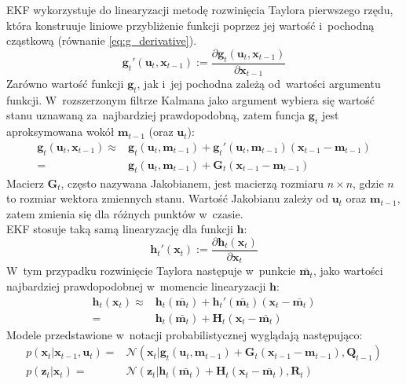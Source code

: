 \par
EKF wykorzystuje do linearyzacji metodę rozwinięcia Taylora pierwszego rzędu, która konstruuje liniowe przybliżenie funkcji poprzez jej wartość i~pochodną cząstkową (równanie \ref{eq:g_derivative}).
\begin{equation} \label{eq:g_derivative}
	\boldsymbol{g}_t'(\boldsymbol{u}_t, \boldsymbol{x}_{t-1}) := \frac{\partial \boldsymbol{g}_t(\boldsymbol{u}_t, \boldsymbol{x}_{t-1})}{\partial \boldsymbol{x}_{t-1}}
\end{equation}
Zarówno wartość funkcji $\boldsymbol{g}_t$, jak i~jej pochodna zależą od~wartości argumentu funkcji. W~rozszerzonym filtrze Kalmana jako argument wybiera się wartość stanu uznawaną za~najbardziej prawdopodobną, zatem funcja $\boldsymbol{g}_t$ jest aproksymowana wokół $\boldsymbol{m}_{t-1}$ (oraz $\boldsymbol{u}_t$):
\begin{align} 
\boldsymbol{g}_t(\boldsymbol{u}_t, \boldsymbol{x}_{t-1}) \approx& \boldsymbol{g}_t(\boldsymbol{u}_t, \boldsymbol{m}_{t-1}) + \boldsymbol{g}_t'(\boldsymbol{u}_t, \boldsymbol{m}_{t-1})(\boldsymbol{x}_{t-1} - \boldsymbol{m}_{t-1}) \nonumber \\
=& \boldsymbol{g}_t(\boldsymbol{u}_t, \boldsymbol{m}_{t-1}) + \boldsymbol{G}_t(\boldsymbol{x}_{t-1} - \boldsymbol{m}_{t-1})
\end{align}
Macierz $\boldsymbol{G}_t$, często nazywana Jakobianem, jest macierzą rozmiaru $n \times n$, gdzie $n$ to rozmiar wektora zmiennych stanu. Wartość Jakobianu zależy od $\boldsymbol{u}_t$ oraz $\boldsymbol{m}_{t-1}$, zatem zmienia się dla różnych punktów w~czasie.\\
EKF stosuje taką samą linearyzację dla funkcji $\boldsymbol{h}$: $$\boldsymbol{h}_t'( \boldsymbol{x}_{t}) := \frac{\partial \boldsymbol{h}_t(\boldsymbol{x}_{t})}{\partial \boldsymbol{x}_{t}}$$ W~tym przypadku rozwinięcie Taylora następuje w~punkcie $\bar{\boldsymbol{m}_t}$, jako wartości najbardziej prawdopodobnej w~momencie linearyzacji $\boldsymbol{h}$:
\begin{align} 
\boldsymbol{h}_t(\boldsymbol{x}_{t}) \approx& \boldsymbol{h}_t(\bar{\boldsymbol{m}_{t}}) + \boldsymbol{h}_t'(\bar{\boldsymbol{m}_{t}})(\boldsymbol{x}_{t} - \bar{\boldsymbol{m}_{t}}) \nonumber \\
=& \boldsymbol{h}_t(\bar{\boldsymbol{m}_{t}}) + \boldsymbol{H}_t (\boldsymbol{x}_{t} - \bar{\boldsymbol{m}_{t}})
\end{align}
Modele przedstawione w~notacji probabilistycznej wyglądają następująco:
\begin{align}\label{eq:ExtendedKalmanProbabilisticModels}
p(\boldsymbol{x}_t|\boldsymbol{x}_{t-1},\boldsymbol{u}_t)=&\mathcal{N}(\boldsymbol{x}_t|\boldsymbol{g}_t(\boldsymbol{u}_t, \boldsymbol{m}_{t-1}) + \boldsymbol{G}_t(\boldsymbol{x}_{t-1} - \boldsymbol{m}_{t-1}),\boldsymbol{Q}_{t-1}) \nonumber \\
p(\boldsymbol{z}_t|\boldsymbol{x}_{t})=&\mathcal{N}(\boldsymbol{z}_t|\boldsymbol{h}_t(\bar{\boldsymbol{m}_{t}}) + \boldsymbol{H}_t (\boldsymbol{x}_{t} - \bar{\boldsymbol{m}_{t}}),\boldsymbol{R}_{t})
\end{align}
